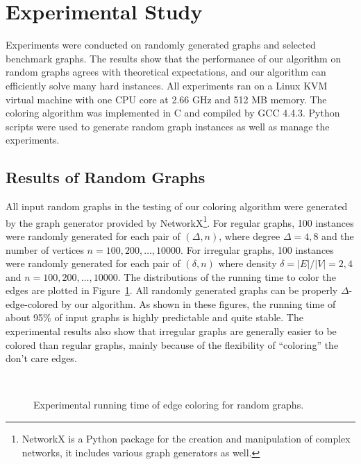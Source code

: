 \documentclass[11pt]{article}
\begin{document}
\section{Experimental Study}

Experiments were conducted on randomly generated graphs and selected benchmark graphs. The results show that the performance of our algorithm on random graphs agrees with theoretical expectations, and our algorithm can efficiently solve many hard instances. All experiments ran on a Linux KVM virtual machine with one CPU core at 2.66 GHz and 512 MB memory. The coloring algorithm was implemented in C and compiled by GCC 4.4.3. Python scripts were used to generate random graph instances as well as manage the experiments.
	
\subsection{Results of Random Graphs}
All input random graphs in the testing of our coloring algorithm were generated by the graph generator provided by NetworkX\footnote{NetworkX is a Python package for the creation and manipulation of complex networks, it includes various graph generators as well.}. For regular graphs, 100 instances were randomly generated for each pair of $(\Delta, n)$, where degree $\Delta=4,8$ and the number of vertices $n=100,200,\ldots,10000$. For irregular graphs, 100 instances were randomly generated for each pair of $(\delta,n)$ where density $\delta=|E|/|V|=2,4$ and $n=100,200,\ldots,10000$. The distributions of the running time to color the edges are plotted in Figure~\ref{fig:random}. All randomly generated graphs can be properly $\Delta$-edge-colored by our algorithm. As shown in these figures, the running time of about 95\% of input graphs is highly predictable and quite stable. The experimental results also show that irregular graphs are generally easier to be colored than regular graphs, mainly because of the flexibility of ``coloring'' the don't care edges.
	
	\begin{figure}[htbp]
		\centering
		\\
		\caption{Experimental running time of edge coloring for random graphs.}
		\label{fig:random}
	\end{figure}
\end{document}
